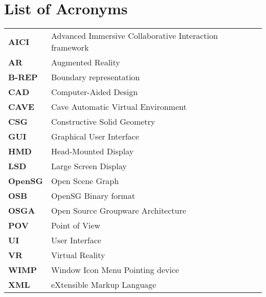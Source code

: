 \chapter*{List of Acronyms}

\begin{tabular}{ll}

\textbf{AICI} & Advanced Immersive Collaborative Interaction framework \\

\textbf{AR} & Augmented Reality \\

\textbf{B-REP} & Boundary representation \\

\textbf{CAD} & Computer-Aided Design \\

\textbf{CAVE} & Cave Automatic Virtual Environment \\

\textbf{CSG} & Constructive Solid Geometry \\

\textbf{GUI} & Graphical User Interface \\

\textbf{HMD} & Head-Mounted Display \\ 

\textbf{LSD} & Large Screen Display \\ 

\textbf{OpenSG} & Open Scene Graph \\

\textbf{OSB} & OpenSG Binary format \\

\textbf{OSGA} & Open Source Groupware Architecture \\

\textbf{POV} & Point of View \\

\textbf{UI} & User Interface \\

\textbf{VR} & Virtual Reality \\

\textbf{WIMP} & Window Icon Menu Pointing device \\

\textbf{XML} & eXtensible Markup Language \\

\end{tabular}
